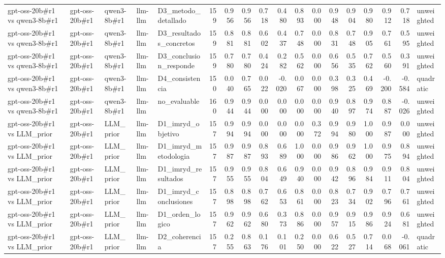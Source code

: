 \begin{table}
{\begin{tabular}{lllllrrrrrrrrrrrrl}
gpt-oss-20b\#r1 vs qwen3-8b\#r1 & gpt-oss-20b\#r1 & qwen3-8b\#r1 & llm-llm & D3\_metodo\_detallado & 159 & 0.956 & 0.956 & 0.718 & 0.480 & 0.893 & 0.000 & 0.948 & 0.904 & 0.980 & 0.912 & 0.718 & unweighted \\
gpt-oss-20b\#r1 vs qwen3-8b\#r1 & gpt-oss-20b\#r1 & qwen3-8b\#r1 & llm-llm & D3\_resultados\_concretos & 159 & 0.881 & 0.881 & 0.602 & 0.437 & 0.748 & 0.000 & 0.831 & 0.748 & 0.905 & 0.761 & 0.595 & unweighted \\
gpt-oss-20b\#r1 vs qwen3-8b\#r1 & gpt-oss-20b\#r1 & qwen3-8b\#r1 & llm-llm & D3\_conclusion\_responde & 159 & 0.780 & 0.780 & 0.424 & 0.282 & 0.562 & 0.000 & 0.656 & 0.535 & 0.762 & 0.560 & 0.391 & unweighted \\
gpt-oss-20b\#r1 vs qwen3-8b\#r1 & gpt-oss-20b\#r1 & qwen3-8b\#r1 & llm-llm & D4\_consistencia & 150 & 0.040 & 0.765 & 0.022 & -0.020 & 0.067 & 0.000 & 0.398 & 0.325 & 0.469 & -0.200 & -0.584 & quadratic \\
gpt-oss-20b\#r1 vs qwen3-8b\#r1 & gpt-oss-20b\#r1 & qwen3-8b\#r1 & llm-llm & no\_evaluable & 160 & 0.944 & 0.944 & 0.000 & 0.000 & 0.000 & 0.000 & 0.940 & 0.897 & 0.974 & 0.887 & -0.026 & unweighted \\
gpt-oss-20b\#r1 vs LLM\_prior & gpt-oss-20b\#r1 & LLM\_prior & llm-llm & D1\_imryd\_objetivo & 157 & 0.994 & 0.994 & 0.000 & 0.000 & 0.000 & 0.372 & 0.994 & 0.980 & 1.000 & 0.987 & 0.000 & unweighted \\
gpt-oss-20b\#r1 vs LLM\_prior & gpt-oss-20b\#r1 & LLM\_prior & llm-llm & D1\_imryd\_metodologia & 157 & 0.987 & 0.987 & 0.893 & 0.689 & 1.000 & 0.000 & 0.986 & 0.962 & 1.000 & 0.975 & 0.894 & unweighted \\
gpt-oss-20b\#r1 vs LLM\_prior & gpt-oss-20b\#r1 & LLM\_prior & llm-llm & D1\_imryd\_resultados & 157 & 0.955 & 0.955 & 0.804 & 0.649 & 0.940 & 0.000 & 0.942 & 0.896 & 0.984 & 0.911 & 0.804 & unweighted \\
gpt-oss-20b\#r1 vs LLM\_prior & gpt-oss-20b\#r1 & LLM\_prior & llm-llm & D1\_imryd\_conclusiones & 157 & 0.898 & 0.898 & 0.762 & 0.653 & 0.861 & 0.000 & 0.823 & 0.734 & 0.902 & 0.796 & 0.761 & unweighted \\
gpt-oss-20b\#r1 vs LLM\_prior & gpt-oss-20b\#r1 & LLM\_prior & llm-llm & D1\_orden\_logico & 157 & 0.962 & 0.962 & 0.680 & 0.373 & 0.886 & 0.000 & 0.957 & 0.915 & 0.986 & 0.924 & 0.681 & unweighted \\
gpt-oss-20b\#r1 vs LLM\_prior & gpt-oss-20b\#r1 & LLM\_prior & llm-llm & D2\_coherencia & 157 & 0.255 & 0.863 & 0.176 & 0.101 & 0.250 & 0.000 & 0.622 & 0.527 & 0.714 & 0.068 & -0.061 & quadratic \\

\end{tabular}}
\end{table}
